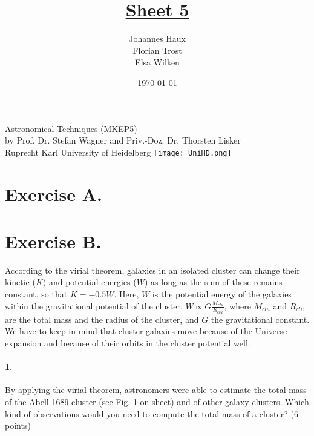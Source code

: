 \documentclass[11pt,a4paper,twoside]{article}
\title{\LARGE \underline {Sheet 5}}
\author{Johannes Haux \\ Florian Trost \\ Elsa Wilken}
\date{\today}
\begin{document}
\maketitle
\thispagestyle{empty}

\begin{center}
  Astronomical Techniques (MKEP5) \\
  \baselineskip35pt
  by Prof. Dr. Stefan Wagner and Priv.-Doz. Dr. Thorsten Lisker \\
  \baselineskip60pt
  Ruprecht Karl University of Heidelberg
\vskip 40pt
\texttt{[image: UniHD.png]}

\end{center}

\newpage
\setcounter{page}{1}		%

\section*{Exercise A.}

\section*{Exercise B.}

According to the virial theorem, galaxies in an isolated cluster can change
their kinetic ($K$) and potential energies ($W$) as long as the sum of these 
remains constant, so that $K = -0.5W$. Here, $W$ is the potential energy of the 
galaxies within the gravitational potential of the cluster, $W \propto 
G \frac{M_{clu}}{R_{clu}}$, where $M_{clu}$ and $R_{clu}$ are the total mass and 
the radius of the cluster, and $G$ the gravitational constant. We have to keep 
in mind that cluster galaxies move because of the Universe expansion and 
because of their orbits in the cluster potential well. \\

\paragraph{1.} By applying the virial theorem, astronomers were able to 
estimate the total mass of the Abell 1689 cluster (see Fig. 1 on sheet) and of 
other galaxy clusters. Which kind of observations would you need to compute 
the total mass of a cluster? (6 points) \\
\end{document}
